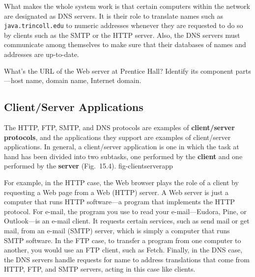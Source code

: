 What makes the whole system work is that certain computers within the
network are designated as DNS servers.  It is their role to translate
names such as {\tt java.trincoll.edu} to numeric addresses whenever
they are requested to do so by clients such as the SMTP or the HTTP
server.  Also, the DNS servers must communicate among themselves to
make sure that their databases of names and addresses are up-to-date.

\label{self-study-exercise}
\begin{SSTUDY}

\item  What's the URL of the Web server at Prentice Hall?  Identify its
component parts---host name, domain name, Internet domain.
\end{SSTUDY}

\subsection{Client/Server Applications}
\noindent The HTTP, FTP, SMTP, and DNS protocols are examples of {\bf
client/server protocols}, and the applications they support are
examples of client/server applications.  In general, a client/server
application is one in which the task at hand has been divided into two
subtasks, one performed by the {\bf client} and one performed by the
{\bf server} (Fig.~15.4).
{fig-clientserverapp}


For example, in the HTTP case, the Web browser plays the role of a
client by requesting a Web page from a Web (HTTP) server.  A Web server
is just a computer that runs HTTP software---a program that
implements the HTTP protocol.   For e-mail, the program you use to read
your e-mail---Eudora, Pine, or Outlook---is an e-mail client.  It
requests certain services, such as send mail or get mail, from an
e-mail (SMTP) server, which is simply a computer that runs SMTP
software.  In the FTP case, to transfer a program from one computer to
another, you would use an FTP client, such as Fetch.  Finally, in the
DNS case, the DNS servers handle requests for name to address
translations that come from HTTP, FTP, and SMTP servers, acting in this
case like clients.

